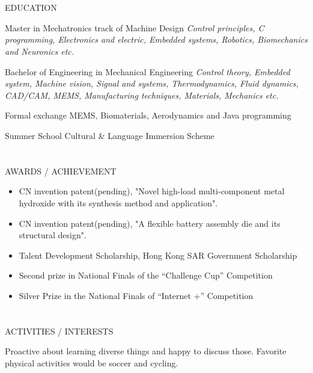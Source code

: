 \documentclass{my_cv}
\begin{document}
\begin{multicols}{2}
\columnbreak



\section{\faGraduationCap}{EDUCATION}
    
{Master in Mechatronics track of Machine Design} %
{\textit{Control principles, C programming, Electronics and electric, Embedded systems, Robotics, Biomechanics and Neuronics etc.}}
    
{Bachelor of Engineering in Mechanical Engineering} %
{\textit{Control theory, Embedded system, Machine vision, Signal and systems, Thermodynamics, Fluid dynamics, CAD/CAM, MEMS, Manufacturing techniques, Materials, Mechanics etc.}}

{Formal exchange} %
{MEMS, Biomaterials, Aerodynamics and Java programming}

{Summer School} %
{Cultural \& Language Immersion Scheme}

\section{\faStar}{AWARDS / ACHIEVEMENT}
\begin{itemize}[noitemsep]
    \item CN invention patent(pending), "Novel high-load multi-component metal hydroxide with its synthesis method and application".
    \item CN invention patent(pending), "A flexible battery
assembly die and its structural design".
    \item Talent Development Scholarship, Hong Kong SAR Government Scholarship
    \item Second prize in National Finals of the “Challenge Cup” Competition
    \item Silver Prize in the National Finals of “Internet +” Competition
\end{itemize}

\section{\faSoccerBallO}{ACTIVITIES / INTERESTS}

Proactive about learning diverse things and happy to discuss those. Favorite physical activities would be soccer and cycling.


\end{multicols}
\end{document}
